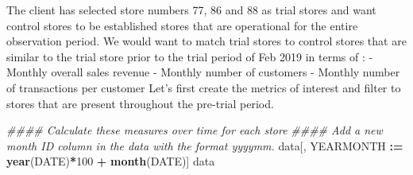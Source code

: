 \documentclass[
]{article}
\newenvironment{Shaded}{\begin{snugshade}}{\end{snugshade}}
\newcommand{\CommentTok}[1]{\textcolor[rgb]{0.56,0.35,0.01}{\textit{#1}}}
\newcommand{\DecValTok}[1]{\textcolor[rgb]{0.00,0.00,0.81}{#1}}
\newcommand{\ErrorTok}[1]{\textcolor[rgb]{0.64,0.00,0.00}{\textbf{#1}}}
\newcommand{\KeywordTok}[1]{\textcolor[rgb]{0.13,0.29,0.53}{\textbf{#1}}}
\newcommand{\NormalTok}[1]{#1}
\newcommand{\OperatorTok}[1]{\textcolor[rgb]{0.81,0.36,0.00}{\textbf{#1}}}
\newcommand{\StringTok}[1]{\textcolor[rgb]{0.31,0.60,0.02}{#1}}
\begin{document}
The client has selected store numbers 77, 86 and 88 as trial stores and
want control stores to be established stores that are operational for
the entire observation period. We would want to match trial stores to
control stores that are similar to the trial store prior to the trial
period of Feb 2019 in terms of : - Monthly overall sales revenue -
Monthly number of customers - Monthly number of transactions per
customer Let's first create the metrics of interest and filter to stores
that are present throughout the pre-trial period.

\begin{Shaded}
\begin{Highlighting}[]
\CommentTok{#### Calculate these measures over time for each store}
\CommentTok{#### Add a new month ID column in the data with the format yyyymm.}
\NormalTok{data[, YEARMONTH }\OperatorTok{:}\ErrorTok{=}\StringTok{ }\KeywordTok{year}\NormalTok{(DATE)}\OperatorTok{*}\DecValTok{100} \OperatorTok{+}\StringTok{ }\KeywordTok{month}\NormalTok{(DATE)]}
\NormalTok{data}
\end{Highlighting}
\end{Shaded}
\end{document}

